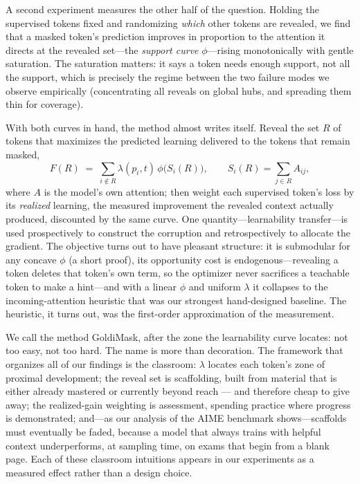 \documentclass{article} %
\begin{document}
A second experiment measures the other half of the question. Holding the supervised tokens fixed and randomizing \emph{which} other tokens are revealed, we find that a masked token's prediction improves in proportion to the attention it directs at the revealed set---the \emph{support curve} $\phi$---rising monotonically with gentle saturation. The saturation matters: it says a token needs enough support, not all the support, which is precisely the regime between the two failure modes we observe empirically (concentrating all reveals on global hubs, and spreading them thin for coverage).

With both curves in hand, the method almost writes itself. Reveal the set $R$ of tokens that maximizes the predicted learning delivered to the tokens that remain masked,
\[
F(R) \;=\; \sum_{i \notin R} \lambda(p_i, t)\, \phi\!\big(S_i(R)\big),
\qquad S_i(R) = \sum_{j \in R} A_{ij},
\]
where $A$ is the model's own attention; then weight each supervised token's loss by its \emph{realized} learning, the measured improvement the revealed context actually produced, discounted by the same curve. One quantity---learnability transfer---is used prospectively to construct the corruption and retrospectively to allocate the gradient. The objective turns out to have pleasant structure: it is submodular for any concave $\phi$ (a short proof), its opportunity cost is endogenous---revealing a token deletes that token's own term, so the optimizer never sacrifices a teachable token to make a hint---and with a linear $\phi$ and uniform $\lambda$ it collapses to the incoming-attention heuristic that was our strongest hand-designed baseline. The heuristic, it turns out, was the first-order approximation of the measurement.

We call the method GoldiMask, after the zone the learnability curve locates: not too easy, not too hard. The name is more than decoration. The framework that organizes all of our findings is the classroom: $\lambda$ locates each token's zone of proximal development; the reveal set is scaffolding, built from material that is either already mastered or currently beyond reach --- and therefore cheap to give away; the realized-gain weighting is assessment, spending practice where progress is demonstrated; and---as our analysis of the AIME benchmark shows---scaffolds must eventually be faded, because a model that always trains with helpful context underperforms, at sampling time, on exams that begin from a blank page. Each of these classroom intuitions appears in our experiments as a measured effect rather than a design choice.
\end{document}
